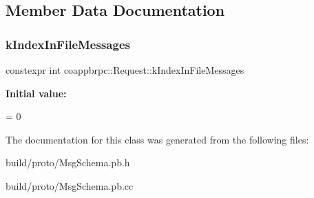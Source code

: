 \subsection{Member Data Documentation}
\mbox{\label{classcoappbrpc_1_1Request_a20c30089794b648d7e2f0d9ad193c625}} 
\subsubsection{\texorpdfstring{k\+Index\+In\+File\+Messages}{kIndexInFileMessages}}
{\footnotesize\ttfamily constexpr int coappbrpc\+::\+Request\+::k\+Index\+In\+File\+Messages\hspace{0.3cm}{\ttfamily [static]}}

{\bfseries Initial value\+:}
\begin{DoxyCode}
=
    0
\end{DoxyCode}


The documentation for this class was generated from the following files\+:\begin{DoxyCompactItemize}
\item 
build/proto/Msg\+Schema.\+pb.\+h\item 
build/proto/Msg\+Schema.\+pb.\+cc\end{DoxyCompactItemize}
